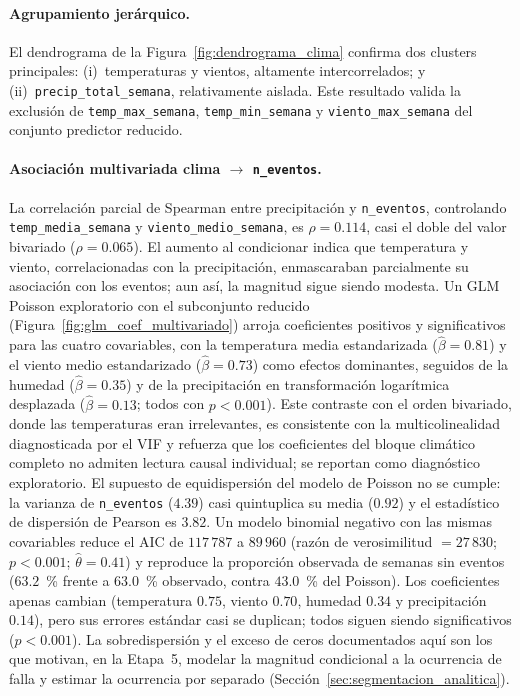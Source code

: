     \paragraph{Agrupamiento jerárquico.} El dendrograma de la Figura~\ref{fig:dendrograma_clima} confirma dos clusters principales: (i)~temperaturas y vientos, altamente intercorrelados; y (ii)~\texttt{precip\_total\_semana}, relativamente aislada. Este resultado valida la exclusión de \texttt{temp\_max\_semana}, \texttt{temp\_min\_semana} y \texttt{viento\_max\_semana} del conjunto predictor reducido.
    
    
    \paragraph{Asociación multivariada clima $\rightarrow$ \texttt{n\_eventos}.} La correlación parcial de Spearman entre precipitación y \texttt{n\_eventos}, controlando \texttt{temp\_media\_semana} y \texttt{viento\_medio\_semana}, es $\rho = 0{.}114$, casi el doble del valor bivariado ($\rho = 0{.}065$). El aumento al condicionar indica que temperatura y viento, correlacionadas con la precipitación, enmascaraban parcialmente su asociación con los eventos; aun así, la magnitud sigue siendo modesta. Un GLM Poisson exploratorio con el subconjunto reducido (Figura~\ref{fig:glm_coef_multivariado}) arroja coeficientes positivos y significativos para las cuatro covariables, con la temperatura media estandarizada ($\hat{\beta} = 0{.}81$) y el viento medio estandarizado ($\hat{\beta} = 0{.}73$) como efectos dominantes, seguidos de la humedad ($\hat{\beta} = 0{.}35$) y de la precipitación en transformación logarítmica desplazada ($\hat{\beta} = 0{.}13$; todos con $p < 0{.}001$). Este contraste con el orden bivariado, donde las temperaturas eran irrelevantes, es consistente con la multicolinealidad diagnosticada por el VIF y refuerza que los coeficientes del bloque climático completo no admiten lectura causal individual; se reportan como diagnóstico exploratorio. El supuesto de equidispersión del modelo de Poisson no se cumple: la varianza de \texttt{n\_eventos} ($4{.}39$) casi quintuplica su media ($0{.}92$) y el estadístico de dispersión de Pearson es $3{.}82$. Un modelo binomial negativo con las mismas covariables reduce el AIC de $117\,787$ a $89\,960$ (razón de verosimilitud $=27\,830$; $p<0{.}001$; $\hat\theta=0{.}41$) y reproduce la proporción observada de semanas sin eventos ($63{.}2$~\% frente a $63{.}0$~\% observado, contra $43{.}0$~\% del Poisson). Los coeficientes apenas cambian (temperatura $0{.}75$, viento $0{.}70$, humedad $0{.}34$ y precipitación $0{.}14$), pero sus errores estándar casi se duplican; todos siguen siendo significativos ($p<0{.}001$). La sobredispersión y el exceso de ceros documentados aquí son los que motivan, en la Etapa~5, modelar la magnitud condicional a la ocurrencia de falla y estimar la ocurrencia por separado (Sección~\ref{sec:segmentacion_analitica}).
    
